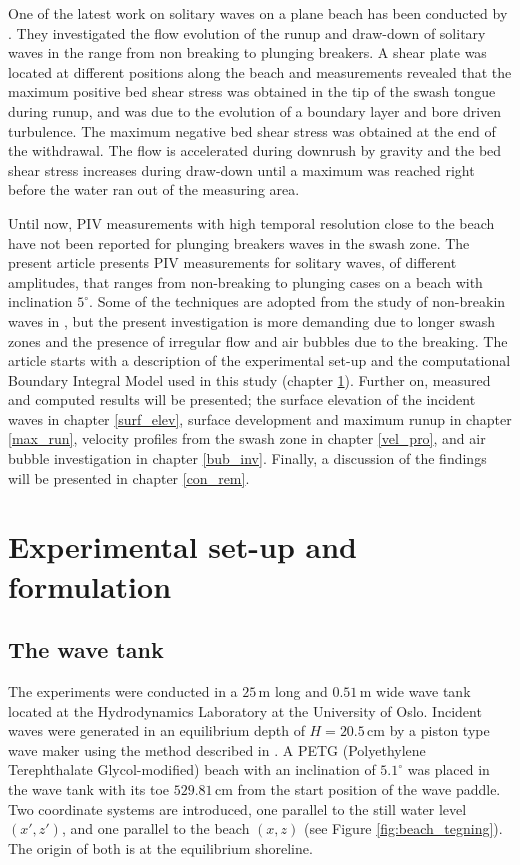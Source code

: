 \documentclass[review, authoryear]{elsarticle}
\newcommand{\cm}{\,\mbox{cm}}
\newcommand{\m}{\,\mbox{m}}
\begin{document}
One of the latest work on solitary waves on a plane beach has been conducted by \cite{pujara2015experimental}. They investigated the flow evolution of the runup and draw-down of solitary waves in the range from non breaking to plunging breakers. A shear plate was located at different positions along the beach and measurements revealed that the maximum positive bed shear stress was obtained in the tip of the swash tongue during runup,  and was due to the evolution of a boundary layer and  bore driven turbulence. The maximum negative bed shear stress was obtained at the end of the withdrawal. The flow is accelerated during downrush by gravity and the bed shear stress increases during draw-down until a maximum was reached right before the water ran out of the measuring area. 


Until now, PIV measurements with high temporal resolution close to the beach 
have not been reported for plunging breakers waves in the swash zone. 
The present article 
presents PIV measurements for solitary waves, of different amplitudes, that 
ranges from non-breaking to plunging cases on a beach with inclination $5^\circ$. Some of the techniques are adopted  from the study of non-breakin waves in \cite{pedersen2013runup}, but the present investigation is more demanding
due to longer swash zones and the presence of irregular flow and air bubbles due to the breaking. 
  The article starts with a description of the experimental set-up
 and the computational Boundary Integral Model used in this study (chapter \ref{experimnetal-set-up}). Further on,  measured and computed results will be presented; the surface elevation of the incident waves in chapter \ref{surf_elev}, surface development and maximum runup in chapter \ref{max_run}, velocity profiles from the swash zone in chapter \ref{vel_pro}, and air bubble investigation in chapter \ref{bub_inv}. Finally, a discussion of the findings will be presented in chapter \ref{con_rem}.

\section{Experimental set-up and formulation}
\label{experimnetal-set-up}

\subsection{The wave tank}
\label{wavetank}

The experiments were conducted in  a $25\m$ long and $0.51\m$ wide wave tank 
located at the Hydrodynamics Laboratory at the University of Oslo.
Incident waves were generated in an equilibrium depth of $H=20.5\cm$ by
a piston type wave maker using the method described in 
\cite{jensen2003experimental}. 
A PETG (Polyethylene Terephthalate Glycol-modified) beach with an inclination of $5.1^{\circ}$ was placed in the wave tank with its toe $529.81\cm$ from the start position of the wave paddle. Two coordinate systems are introduced, one parallel to the still water level $(x',z')$, and one parallel to the beach $(x,z)$ (see Figure \ref{fig:beach_tegning}).  The origin of both is at the equilibrium shoreline.
\end{document}

